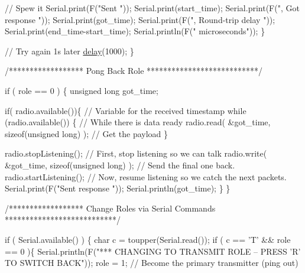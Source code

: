 \begin{DoxyCodeInclude}
        \textcolor{comment}{// Spew it}
        Serial.print(F(\textcolor{stringliteral}{"Sent "}));
        Serial.print(start\_time);
        Serial.print(F(\textcolor{stringliteral}{", Got response "}));
        Serial.print(got\_time);
        Serial.print(F(\textcolor{stringliteral}{", Round-trip delay "}));
        Serial.print(end\_time-start\_time);
        Serial.println(F(\textcolor{stringliteral}{" microseconds"}));
    \}

    \textcolor{comment}{// Try again 1s later}
    \hyperlink{group__Porting__General_ga70a331e8ddf9acf9d33c47b71cda4c5f}{delay}(1000);
  \}



\textcolor{comment}{/****************** Pong Back Role ***************************/}

  \textcolor{keywordflow}{if} ( role == 0 )
  \{
    \textcolor{keywordtype}{unsigned} \textcolor{keywordtype}{long} got\_time;
    
    \textcolor{keywordflow}{if}( radio.available())\{
                                                                    \textcolor{comment}{// Variable for the received timestamp}
      \textcolor{keywordflow}{while} (radio.available()) \{                                   \textcolor{comment}{// While there is data ready}
        radio.read( &got\_time, \textcolor{keyword}{sizeof}(\textcolor{keywordtype}{unsigned} \textcolor{keywordtype}{long}) );             \textcolor{comment}{// Get the payload}
      \}
     
      radio.stopListening();                                        \textcolor{comment}{// First, stop listening so we can talk
         }
      radio.write( &got\_time, \textcolor{keyword}{sizeof}(\textcolor{keywordtype}{unsigned} \textcolor{keywordtype}{long}) );              \textcolor{comment}{// Send the final one back.      }
      radio.startListening();                                       \textcolor{comment}{// Now, resume listening so we catch
       the next packets.     }
      Serial.print(F(\textcolor{stringliteral}{"Sent response "}));
      Serial.println(got\_time);  
   \}
 \}




\textcolor{comment}{/****************** Change Roles via Serial Commands ***************************/}

  \textcolor{keywordflow}{if} ( Serial.available() )
  \{
    \textcolor{keywordtype}{char} c = toupper(Serial.read());
    \textcolor{keywordflow}{if} ( c == \textcolor{charliteral}{'T'} && role == 0 )\{      
      Serial.println(F(\textcolor{stringliteral}{"*** CHANGING TO TRANSMIT ROLE -- PRESS 'R' TO SWITCH BACK"}));
      role = 1;                  \textcolor{comment}{// Become the primary transmitter (ping out)}
    

\end{DoxyCodeInclude}

